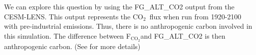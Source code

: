 \documentclass[12pt]{article}
\newcommand{\FCO}{F$_{\mathrm{CO}_{2}}$}
\newcommand{\CO}{CO$_{2}$}
\begin{document}
We can explore this question by using the FG\_ALT\_CO2 output from the CESM-LENS. This output represents the \CO~flux when run from 1920-2100 with pre-industrial emissions. Thus, there is no anthropogenic carbon involved in this simulation. The difference between \FCO and FG\_ALT\_CO2 is then anthropogenic carbon. (See \citet{lovenduski_enhanced_2007} for more details)


\clearpage

\clearpage

\end{document}
